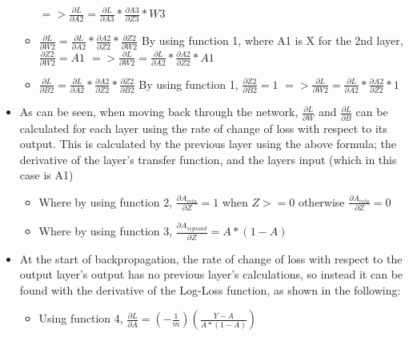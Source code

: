 \documentclass[./project-report/src/latex/project-report.tex]{subfiles}
\begin{document}
\begin{itemize}
\begin{itemize}
              \vspace{1mm}
              \newline
              $=> \frac{\partial{L}}{\partial{A2}} =  \frac{\partial{L}}{\partial{A3}} * \frac{\partial{A3}}{\partial{Z3}} * W3$
        \item $\frac{\partial{L}}{\partial{W2}} = \frac{\partial{L}}{\partial{A2}} * \frac{\partial{A2}}{\partial{Z2}} * \frac{\partial{Z2}}{\partial{W2}}$
              \vspace{1mm}
              \newline
              By using function 1, where A1 is X for the 2nd layer, $\frac{\partial{Z2}}{\partial{W2}} = A1$
              \vspace{1mm}
              \newline
              $=> \frac{\partial{L}}{\partial{W2}} = \frac{\partial{L}}{\partial{A2}} * \frac{\partial{A2}}{\partial{Z2}} * A1$
        \item $\frac{\partial{L}}{\partial{B2}} = \frac{\partial{L}}{\partial{A2}} * \frac{\partial{A2}}{\partial{Z2}} * \frac{\partial{Z2}}{\partial{B2}}$
              \vspace{1mm}
              \newline
              By using function 1, $\frac{\partial{Z2}}{\partial{B2}} = 1$
              \vspace{1mm}
              \newline
              $=> \frac{\partial{L}}{\partial{W2}} = \frac{\partial{L}}{\partial{A2}} * \frac{\partial{A2}}{\partial{Z2}} * 1$
    \end{itemize}
    \item As can be seen, when moving back through the network, $\frac{\partial{L}}{\partial{W}}$ and $\frac{\partial{L}}{\partial{B}}$ can be calculated for each layer using 
		  the rate of change of loss with respect to its output. This is calculated by the previous layer using the above formula; the derivative of the layer's transfer 
		  function, and the layers input (which in this case is A1)
    \begin{itemize}
        \item Where by using function 2, $\frac{\partial{A_{relu}}}{\partial{Z}} = 1$ when $Z >= 0$ otherwise $\frac{\partial{A_{relu}}}{\partial{Z}} = 0$
        \item Where by using function 3, $\frac{\partial{A_{sigmoid}}}{\partial{Z}} = A * (1 - A)$
    \end{itemize}
    \item At the start of backpropagation, the rate of change of loss with respect to the output layer's output has no previous layer's calculations, so instead it can 
          be found with the derivative of the Log-Loss function, as shown in the following:
    \begin{itemize}
        \item Using function 4, $\frac{\partial{L}}{\partial{A}} = (-\frac{1}{m})(\frac{Y-A}{A * (1-A)})$
    \end{itemize}
\end{itemize}
\end{document}
